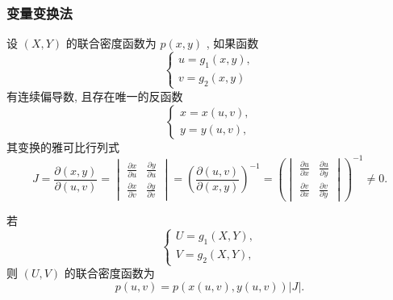     \subsubsection{变量变换法}
    设 $(X,Y)$ 的联合密度函数为 $p(x,y)$ , 如果函数
    \begin{equation*}
    	\begin{cases}
    	u=g_{1}(x,y),\\
    	v=g_{2}(x,y)
    	\end{cases}
    \end{equation*}
    有连续偏导数, 且存在唯一的反函数
    \begin{equation*}
    	\begin{cases}
    	x=x(u,v),\\
    	y=y(u,v),
    	\end{cases}
    \end{equation*}
    其变换的雅可比行列式
    \begin{equation}\label{eq:3.3.19}
    	J=\frac{\partial(x,y)}{\partial(u,v)}=
    	\begin{vmatrix}
    	\frac{\partial x}{\partial u} & \frac{\partial y}{\partial u}\\
    	\frac{\partial x}{\partial v} & \frac{\partial y}{\partial v}
    	\end{vmatrix}=
    	\left( \frac{\partial(u,v)}{\partial(x,y)}
    	\right) ^{-1}=
    	\left( 
    	\begin{vmatrix}
    	\frac{\partial u}{\partial x} & \frac{\partial u}{\partial y}\\
    	\frac{\partial v}{\partial x} & \frac{\partial v}{\partial y}
    	\end{vmatrix}
    	\right) ^{-1}\ne0.
    \end{equation}
    
    若
    \begin{equation*}
    	\begin{cases}
    	U=g_{1}(X,Y),\\
    	V=g_{2}(X,Y),
    	\end{cases}
    \end{equation*}
    则 $(U,V)$ 的联合密度函数为
    \begin{equation}\label{eq:3.3.20}
    	p(u,v)=p(x(u,v),y(u,v))|J|.
    \end{equation}
    
